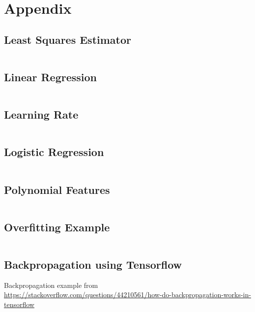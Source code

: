 \documentclass[a4paper,twoside,10pt]{article}
\begin{document}
\clearpage

\appendix
\section{Appendix}
\subsection{Least Squares Estimator}\label{app:lse}
\inputminted[frame=lines,linenos,fontsize=\small]{python}{least_squares.py}

\subsection{Linear Regression}\label{app:gradientdescent}
\inputminted[frame=lines,linenos,fontsize=\small]{python}{gradient_descent.py}

\subsection{Learning Rate}\label{app:alphas}
\inputminted[frame=lines,linenos,fontsize=\small]{python}{learning_rate.py}

\subsection{Logistic Regression}\label{app:classifier}
\inputminted[frame=lines,linenos,fontsize=\small]{python}{classifier.py}

\subsection{Polynomial Features}\label{app:polynomial}
\inputminted[frame=lines,linenos,fontsize=\small]{python}{polynomial.py}

\subsection{Overfitting Example}\label{app:overfitting}
\inputminted[frame=lines,linenos,fontsize=\small]{python}{overfitting.py}

\subsection{Backpropagation using Tensorflow}\label{app:backprop}
Backpropagation example from \url{https://stackoverflow.com/questions/44210561/how-do-backpropagation-works-in-tensorflow}
\inputminted[frame=lines,linenos,fontsize=\small]{python}{backprop.py}
\end{document}
